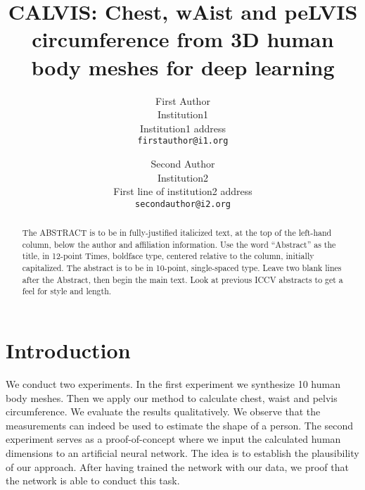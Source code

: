 \documentclass[10pt,twocolumn,letterpaper]{article}
\begin{document}
\title{CALVIS: Chest, wAist and peLVIS circumference from 3D human body meshes for deep learning}

\author{First Author\\
Institution1\\
Institution1 address\\
{\tt\small firstauthor@i1.org}
\and
Second Author\\
Institution2\\
First line of institution2 address\\
{\tt\small secondauthor@i2.org}
}

\maketitle
\ificcvfinal\thispagestyle{empty}\fi

\begin{abstract}
   The ABSTRACT is to be in fully-justified italicized text, at the top
   of the left-hand column, below the author and affiliation
   information. Use the word ``Abstract'' as the title, in 12-point
   Times, boldface type, centered relative to the column, initially
   capitalized. The abstract is to be in 10-point, single-spaced type.
   Leave two blank lines after the Abstract, then begin the main text.
   Look at previous ICCV abstracts to get a feel for style and length.
\end{abstract}

\section{Introduction}

We conduct two experiments. In the first experiment we synthesize 10 human body meshes. Then we apply our method to calculate chest, waist and pelvis circumference. We evaluate the results qualitatively. We observe that the measurements can indeed be used to estimate the shape of a person. The second experiment serves as a proof-of-concept where we input the calculated human dimensions to an artificial neural network. The idea is to establish the plausibility of our approach. After having trained the network with our data, we proof that the network is able to conduct this task.
\end{document}
